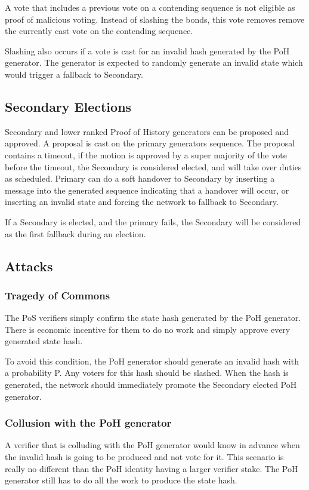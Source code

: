 \documentclass[12pt]{article}
\begin{document}
A vote that includes a previous vote on a contending sequence is not eligible as proof of malicious voting. Instead of slashing the bonds, this vote removes remove the currently cast vote on the contending sequence.

Slashing also occurs if a vote is cast for an invalid hash generated by the PoH generator. The generator is expected to randomly generate an invalid state which would trigger a fallback to Secondary.
\subsection{Secondary Elections}
Secondary and lower ranked Proof of History generators can be proposed and approved. A proposal is cast on the primary generators sequence. The proposal contains a timeout, if the motion is approved by a super majority of the vote before the timeout, the Secondary is considered elected, and will take over duties as scheduled. Primary can do a soft handover to Secondary by inserting a message into the generated sequence indicating that a handover will occur, or inserting an invalid state and forcing the network to fallback to Secondary.

If a Secondary is elected, and the primary fails, the Secondary will be considered as the first fallback during an election.

\subsection{Attacks}
\subsubsection{Tragedy of Commons}

The PoS verifiers simply confirm the state hash generated by the PoH generator. There is economic incentive for them to do no work and simply approve every generated state hash. 

To avoid this condition, the PoH generator should generate an invalid hash with a probability P. Any voters for this hash should be slashed. When the hash is generated, the network should immediately promote the Secondary elected PoH generator.

\subsubsection{Collusion with the PoH generator}\label{subsubsec:collusion}
A verifier that is colluding with the PoH generator would know in advance when the invalid hash is going to be produced and not vote for it. This scenario is really no different than the PoH identity having a larger verifier stake. The PoH generator still has to do all the work to produce the state hash.
\end{document}
